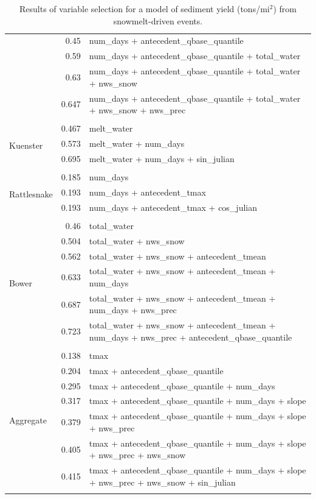 \documentclass[10pt]{article}
\begin{document}
\begin{table}[h]
\begin{center}
\begin{tabular}{lrl}
 & 0.45 & num\_days + antecedent\_qbase\_quantile\\ 
 & 0.59 & num\_days + antecedent\_qbase\_quantile + total\_water\\ 
 & 0.63 & num\_days + antecedent\_qbase\_quantile + total\_water + nws\_snow\\ 
 & 0.647 & num\_days + antecedent\_qbase\_quantile + total\_water + nws\_snow + nws\_prec\\ 
\vspace{2mm}\\ \multirow{4}{*}{Kuenster} & 0.467 & melt\_water\\ 
 & 0.573 & melt\_water + num\_days\\ 
 & 0.695 & melt\_water + num\_days + sin\_julian\\ 
\vspace{2mm}\\ \multirow{4}{*}{Rattlesnake} & 0.185 & num\_days\\ 
 & 0.193 & num\_days + antecedent\_tmax\\ 
 & 0.193 & num\_days + antecedent\_tmax + cos\_julian\\ 
\vspace{2mm}\\ \multirow{7}{*}{Bower} & 0.46 & total\_water\\ 
 & 0.504 & total\_water + nws\_snow\\ 
 & 0.562 & total\_water + nws\_snow + antecedent\_tmean\\ 
 & 0.633 & total\_water + nws\_snow + antecedent\_tmean + num\_days\\ 
 & 0.687 & total\_water + nws\_snow + antecedent\_tmean + num\_days + nws\_prec\\ 
 & 0.723 & total\_water + nws\_snow + antecedent\_tmean + num\_days + nws\_prec + antecedent\_qbase\_quantile\\ 
\vspace{2mm}\\ \multirow{8}{*}{Aggregate} & 0.138 & tmax\\ 
 & 0.204 & tmax + antecedent\_qbase\_quantile\\ 
 & 0.295 & tmax + antecedent\_qbase\_quantile + num\_days\\ 
 & 0.317 & tmax + antecedent\_qbase\_quantile + num\_days + slope\\ 
 & 0.379 & tmax + antecedent\_qbase\_quantile + num\_days + slope + nws\_prec\\ 
 & 0.405 & tmax + antecedent\_qbase\_quantile + num\_days + slope + nws\_prec + nws\_snow\\ 
 & 0.415 & tmax + antecedent\_qbase\_quantile + num\_days + slope + nws\_prec + nws\_snow + sin\_julian\\ 
\vspace{2mm}\\     \end{tabular}
    \caption{Results of variable selection for a model of sediment yield (tons/$\text{mi}^2$) from snowmelt-driven events.\label{sed_r_square_snow}}
    \end{center}
\end{table}
\end{document}
